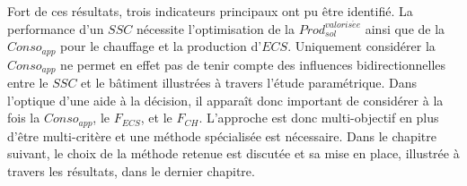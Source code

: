 Fort de ces résultats, trois indicateurs principaux ont pu être identifié. La performance
d’un $SSC$ nécessite l’optimisation de la $Prod_{sol}^{valoris\acute ee}$ ainsi que de la
$Conso_{app}$ pour le chauffage et la production d’$ECS$. Uniquement considérer la
$Conso_{app}$ ne permet en effet pas de tenir compte des influences bidirectionnelles
entre le $SSC$ et le bâtiment illustrées à travers l’étude paramétrique. Dans l’optique
d’une aide à la décision, il apparaît donc important de considérer à la fois la
$Conso_{app}$, le $F_{ECS}$, et le $F_{CH}$. L’approche est donc multi-objectif en plus
d’être multi-critère et une méthode spécialisée est nécessaire. Dans le chapitre suivant,
le choix de la méthode retenue est discutée et sa mise en place, illustrée à travers les
résultats, dans le dernier chapitre.

